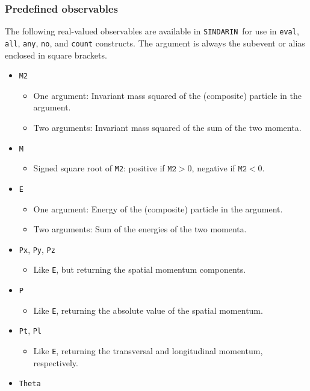 \documentclass[12pt]{book}
\newcommand{\ttt}[1]{\texttt{#1}}
\newcommand{\sindarin}{\ttt{SINDARIN}}
\begin{document}
\subsubsection{Predefined observables}

The following real-valued observables are available in \sindarin\ for use in
\ttt{eval}, \ttt{all}, \ttt{any}, \ttt{no}, and \ttt{count} constructs.  The
argument is always the subevent or alias enclosed in square brackets.
\begin{itemize}
\item \ttt{M2}
  \begin{itemize}
  \item One argument: Invariant mass squared of the (composite) particle in the
    argument.
  \item Two arguments: Invariant mass squared of the sum of the two momenta.
  \end{itemize}
\item \ttt{M}
  \begin{itemize}
  \item Signed square root of \ttt{M2}: positive if $\ttt{M2}>0$, negative if
    $\ttt{M2}<0$.
  \end{itemize}
\item \ttt{E}
  \begin{itemize}
  \item One argument: Energy of the (composite) particle in the argument.
  \item Two arguments: Sum of the energies of the two momenta.
  \end{itemize}
\item \ttt{Px}, \ttt{Py}, \ttt{Pz}
  \begin{itemize}
  \item Like \ttt{E}, but returning the spatial momentum components.
  \end{itemize}
\item \ttt{P}
  \begin{itemize}
  \item Like \ttt{E}, returning the absolute value of the spatial momentum.
  \end{itemize}
\item \ttt{Pt}, \ttt{Pl}
  \begin{itemize}
  \item Like \ttt{E}, returning the transversal and longitudinal momentum,
    respectively.
  \end{itemize}
\item \ttt{Theta}
  \begin{itemize}

\end{itemize}
\end{itemize}
\end{document}
